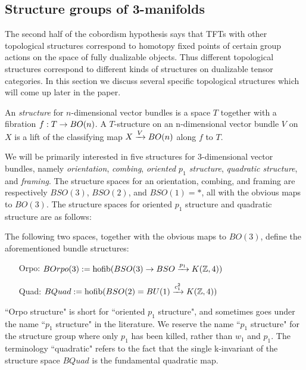 \documentclass{amsart}
\begin{document}
\subsection{Structure groups of 3-manifolds} \label{sec-lft-struc}

The second half of the cobordism hypothesis says that TFTs with other topological structures correspond to homotopy fixed points of certain group actions on the space of fully dualizable objects.  Thus different topological structures correspond to different kinds of structures on dualizable tensor categories.  In this section we discuss several specific topological structures which will come up later in the paper.

\begin{definition}
An \emph{structure} for $n$-dimensional vector bundles is a space $T$ together with a fibration $f: T \rightarrow BO(n)$.  A $T$-structure on an n-dimensional vector bundle $V$ on $X$ is a lift of the classifying map $X \xrightarrow{V} BO(n)$ along $f$ to $T$.
\end{definition}

We will be primarily interested in five structures for 3-dimensional vector bundles, namely \emph{orientation}, \emph{combing}, \emph{oriented $p_1$ structure}, \emph{quadratic structure}, and \emph{framing}.  The structure spaces for an orientation, combing, and framing are respectively $BSO(3)$, $BSO(2)$, and $BSO(1) = *$, all with the obvious maps to $BO(3)$.  The structure spaces for oriented $p_1$ structure and quadratic structure are as follows:
\begin{definition}
The following two spaces, together with the obvious maps to $BO(3)$, define the aforementioned bundle structures:
\begin{itemize}
\item[Orpo:] $BOrpo(3) := \operatorname{hofib}(BSO(3) \rightarrow BSO \xrightarrow{p_1} K(\mathbb Z,4))$
\item[Quad:] $BQuad := \operatorname{hofib}(BSO(2) = BU(1) \xrightarrow{c_1^2} K(\mathbb Z,4))$
\end{itemize}
\end{definition}

\begin{remark}
``Orpo structure" is short for ``oriented $p_1$ structure", and sometimes goes under the name ``$p_1$ structure" in the literature.  We reserve the name ``$p_1$ structure" for the structure group where only $p_1$ has been killed, rather than $w_1$ and $p_1$.  The terminology ``quadratic" refers to the fact that the single k-invariant of the structure space $BQuad$ is the fundamental quadratic map.
\end{remark}
\end{document}
